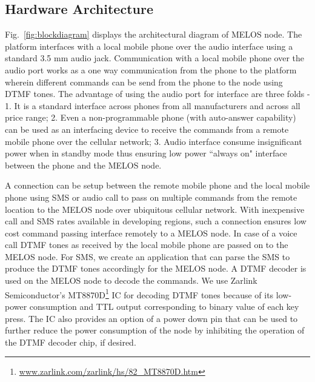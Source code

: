 \documentclass[10pt]{sigplan-proc-varsize}
\newcommand{\figref}[1]{Fig.~\ref{#1}}
\newcommand{\melos}{MELOS }
\begin{document}
\subsection{Hardware Architecture}
\figref{fig:blockdiagram} displays the architectural diagram of \melos node. The platform interfaces with a local mobile phone over the audio interface using a standard 3.5 mm audio jack. Communication with a local mobile phone over the audio port works as a one way communication from the phone to the platform wherein different commands can be send from the phone to the node using DTMF tones. The advantage of using the audio port for interface are three folds - 1. It is a standard interface across phones from all manufacturers and across all price range; 2. Even a non-programmable phone (with auto-answer capability) can be used as an interfacing device to receive the commands from a remote mobile phone over the cellular network; 3. Audio interface consume insignificant power when in standby mode thus ensuring low power ``always on" interface between the phone and the \melos node. 

A connection can be setup between the remote mobile phone and the local mobile phone using SMS or audio call to pass on multiple commands from the remote location to the \melos node over ubiquitous cellular network. With inexpensive call and SMS rates available in developing regions, such a connection ensures low cost command passing interface remotely to a \melos node. In case of a voice call DTMF tones as received by the local mobile phone are passed on to the \melos node. For SMS, we create an application that can parse the SMS to produce the DTMF tones accordingly for the \melos node. A DTMF decoder is used on the \melos node to decode the commands. We use Zarlink Semiconductor's MT8870D\footnote{\url{www.zarlink.com/zarlink/hs/82_MT8870D.htm}} IC for decoding DTMF tones because of its low-power consumption and TTL output corresponding to binary value of each key press. The IC also provides an option of a power down pin that can be used to further reduce the power consumption of the node by inhibiting the operation of the DTMF decoder chip, if desired.
\end{document}
